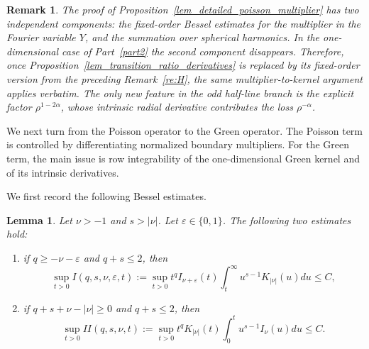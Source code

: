 \documentclass[12pt]{amsart}
\newtheorem{lemma}[theorem]{Lemma}
\newtheorem{remark}[theorem]{Remark}
\begin{document}
\begin{remark}\label{re:multiplier}
The proof of Proposition~\ref{lem_detailed_poisson_multiplier} has two independent
components: the fixed-order Bessel estimates for the multiplier in the Fourier
variable $Y$, and the summation over spherical harmonics. In the one-dimensional
case of Part~\ref{part2} the second component disappears. Therefore, once Proposition~\ref{lem_transition_ratio_derivatives} is replaced by its fixed-order version from the preceding Remark~\ref{re:H}, the same multiplier-to-kernel argument applies
verbatim. The only new feature in the odd half-line branch is the explicit factor
$\rho^{1-2\alpha}$, whose intrinsic radial derivative contributes the loss $\rho^{-\alpha}$.
\end{remark}

We next turn from the Poisson operator to the Green operator. The Poisson term is
controlled by differentiating normalized boundary multipliers. For the Green term,
the main issue is row integrability of the one-dimensional Green kernel and of its
intrinsic derivatives. 


We first record the following Bessel estimates.

\begin{lemma}\label{lem:Bessel:integral}
Let $\nu>-1$ and $s>|\nu|$. Let $\varepsilon \in \{0,1\}$. The following two estimates hold:
\begin{enumerate}[label=(\roman*)]
    \item if $q\ge -\nu - \varepsilon$ and $q+s\le 2$, then
    \begin{equation*}
        \sup_{t>0}I(q,s,\nu,\varepsilon,t):=\sup_{t>0} t^q I_{\nu+\varepsilon}(t) \int_t^\infty u^{s-1} K_{|\nu|}(u) du \le C,
    \end{equation*}
    \item if $q+s+\nu-|\nu|\ge 0$ and $q+s\le 2$, then
    \begin{equation*}
        \sup_{t>0}II(q,s,\nu,t):= \sup_{t>0} t^q K_{|\nu|}(t) \int_0^t u^{s-1} I_{\nu}(u) du \le C.
    \end{equation*}
\end{enumerate}
\end{lemma}
\end{document}
